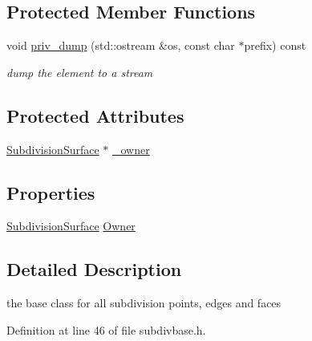 \subsection*{Protected Member Functions}
\begin{DoxyCompactItemize}
\item 
void \hyperlink{classShipCADGeometry_1_1SubdivisionBase_a024aa781bbf2e54b6fb088e33126998e}{priv\-\_\-dump} (std\-::ostream \&os, const char $\ast$prefix) const 
\begin{DoxyCompactList}\small\item\em dump the element to a stream \end{DoxyCompactList}\end{DoxyCompactItemize}
\subsection*{Protected Attributes}
\begin{DoxyCompactItemize}
\item 
\hyperlink{classShipCADGeometry_1_1SubdivisionSurface}{Subdivision\-Surface} $\ast$ \hyperlink{classShipCADGeometry_1_1SubdivisionBase_a5a9ce820f644a1ecd9ddb802270f31a9}{\-\_\-owner}
\end{DoxyCompactItemize}
\subsection*{Properties}
\begin{DoxyCompactItemize}
\item 
\hyperlink{classShipCADGeometry_1_1SubdivisionSurface}{Subdivision\-Surface} \hyperlink{classShipCADGeometry_1_1SubdivisionBase_af3adf1c6df9fd4ddb5c945193fe5c65e}{Owner}
\end{DoxyCompactItemize}


\subsection{Detailed Description}
the base class for all subdivision points, edges and faces 



Definition at line 46 of file subdivbase.\-h.



